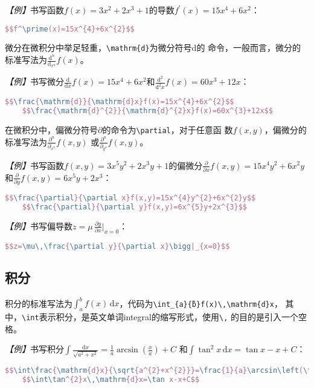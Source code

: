 \emph{【例】}书写函数$f\left(x\right)=3x^{2}+2x^{3}+1$的导数$f^\prime(x)=15x^{4}+6x^{2}$：
\begin{lstlisting}[language=TeX]
    $$f^\prime(x)=15x^{4}+6x^{2}$$
\end{lstlisting}

微分在微积分中举足轻重，\texttt{\textbackslash{}mathrm\{d\}}为微分符号$\mathrm{d}$的
命令，一般而言，微分的标准写法为$\frac{\mathrm{d}^{n}}{\mathrm{d}_{x^{n}}}f\left(x\right)$。

\emph{【例】}书写微分$\frac{\mathrm{d}}{\mathrm{d}x}f(x)=15x^{4}+6x^{2}$和$\frac{\mathrm{d}^{2}}{\mathrm{d}^{2}x}f(x)=60x^{3}+12x$：
\begin{lstlisting}[language=TeX]
    $$\frac{\mathrm{d}}{\mathrm{d}x}f(x)=15x^{4}+6x^{2}$$
    $$\frac{\mathrm{d}^{2}}{\mathrm{d}^{2}x}f(x)=60x^{3}+12x$$
\end{lstlisting}

在微积分中，偏微分符号$\partial$的命令为\texttt{\textbackslash{}partial}，对于任意函
数$f\left(x,y\right)$，偏微分的标准写法为$\frac{\partial^{n}}{\partial_{x^{n}}}f\left(x,y\right)$
或$\frac{\partial^{n}}{\partial_{y^{n}}}f\left(x,y\right)$。

\emph{【例】}书写函数$f\left(x,y\right)=3x^5y^2+2x^3y+1$的偏微分$\frac{\partial}{\partial x}f(x,y)=15x^{4}y^{2}+6x^{2}y$和$\frac{\partial}{\partial y}f(x,y)=6x^{5}y+2x^{3}$：
\begin{lstlisting}[language=TeX]
    $$\frac{\partial}{\partial x}f(x,y)=15x^{4}y^{2}+6x^{2}y$$
    $$\frac{\partial}{\partial y}f(x,y)=6x^{5}y+2x^{3}$$
\end{lstlisting}

\emph{【例】}书写偏导数$z=\mu\,\frac{\partial y}{\partial x}\bigg|_{x=0}$：
\begin{lstlisting}[language=TeX]
    $$z=\mu\,\frac{\partial y}{\partial x}\bigg|_{x=0}$$
\end{lstlisting}

\subsection{积分}
积分的标准写法为$\int_{a}^{b}f(x)\,\mathrm{d}x$，代码为\texttt{\textbackslash{}int\_\{a\}\^\{b\}f(x)\textbackslash{},\textbackslash{}mathrm\{d\}x}，
其中，\texttt{\textbackslash{}int}表示积分，是英文单词integral的缩写形式，使用\texttt{\textbackslash{},}
的目的是引入一个空格。

\emph{【例】}书写积分$\int\frac{\mathrm{d}x}{\sqrt{a^{2}+x^{2}}}=\frac{1}{a}\arcsin\left(\frac{x}{a}\right)+C$
和$\int\tan^{2}x\,\mathrm{d}x=\tan x-x+C$：
\begin{lstlisting}[language=TeX]
    $$\int\frac{\mathrm{d}x}{\sqrt{a^{2}+x^{2}}}=\frac{1}{a}\arcsin\left(\frac{x}{a}\right)+C$$
    $$\int\tan^{2}x\,\mathrm{d}x=\tan x-x+C$$
\end{lstlisting}

